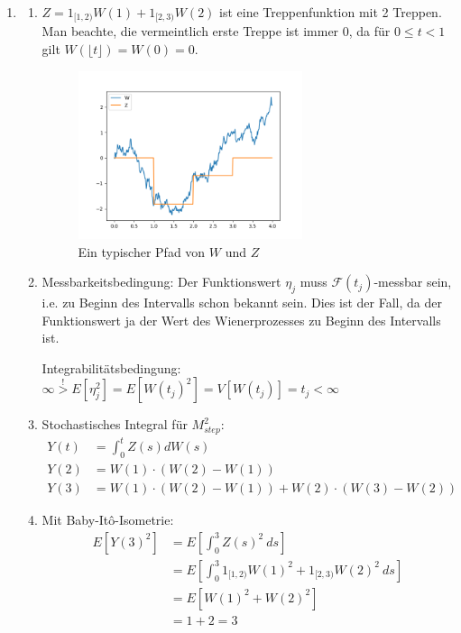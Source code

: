\documentclass[a4paper,11pt,notitlepage,fullpage]{article}
\begin{document}
\begin{enumerate}
\begin{enumerate}
\end{enumerate}
\item
\begin{enumerate}
\item $Z = 1_{[1, 2)} W(1) + 1_{[2, 3)} W(2)$ ist eine Treppenfunktion mit 2 Treppen. Man beachte, die vermeintlich erste Treppe ist immer 0, da für $0 \leq t < 1$ gilt $W(\lfloor t\rfloor) = W(0) = 0$.
\begin{figure}[h!]
\centering
\includegraphics[width=0.66\textwidth]{gfx/14_fig.png}
\caption{Ein typischer Pfad von $W$ und $Z$}
\end{figure}

\item Messbarkeitsbedingung: Der Funktionswert $\eta_j$ muss $\mathcal F(t_j)$-messbar sein, i.e. zu Beginn des Intervalls schon bekannt sein. Dies ist der Fall, da der Funktionswert ja der Wert des Wienerprozesses zu Beginn des Intervalls ist.

Integrabilitätsbedingung: $\infty \stackrel{!}{>} E[\eta_j^2] = E[W(t_j)^2] = V[W(t_j)] = t_j < \infty$

\item Stochastisches Integral für $M_{step}^2$:
\begin{align*}
Y(t) &= \int_0^t Z(s)dW(s) \\
Y(2) &= W(1) \cdot (W(2) - W(1)) \\
Y(3) &= W(1) \cdot (W(2) - W(1)) + W(2) \cdot (W(3) - W(2))
\end{align*}

\item Mit Baby-Itô-Isometrie:
\begin{align*}
E\left[Y(3)^2\right] &= E\left[\int_0^3 Z(s)^2 ~ds\right] \\
&= E\left[\int_0^3 1_{[1, 2)} W(1)^2 + 1_{[2, 3)} W(2)^2 ~ds\right] \\
&= E\left[W(1)^2 + W(2)^2\right] \\
&= 1 + 2 = 3 \\
\end{align*}


\end{enumerate}
\end{enumerate}
\end{document}

